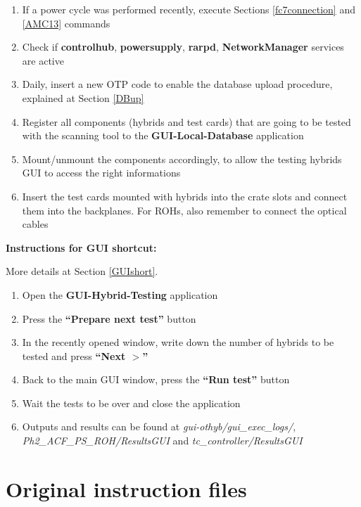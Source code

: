 \documentclass[10pt,a4paper]{article}
\begin{document}
\begin{enumerate}
    \item If a power cycle was performed recently, execute Sections \ref{fc7connection} and \ref{AMC13} commands
    \item Check if \textbf{controlhub}, \textbf{powersupply}, \textbf{rarpd}, \textbf{NetworkManager} services are active 
    \item Daily, insert a new OTP code to enable the database upload procedure, explained at Section \ref{DBup}
    \item Register all components (hybrids and test cards) that are going to be tested with the scanning tool to the \textbf{GUI-Local-Database} application 
    \item Mount/unmount the components accordingly, to allow the testing hybrids GUI to access the right informations
    \item Insert the test cards mounted with hybrids into the crate slots and connect them into the backplanes. For ROHs, also remember to connect the optical cables
\end{enumerate}

\vspace{1cm}

{\Large{\textbf{Instructions for GUI shortcut:}}}
\newline

More details at Section \ref{GUIshort}.

\begin{enumerate}
    \item Open the \textbf{GUI-Hybrid-Testing} application
    \item Press the \textbf{``Prepare next test''} button
    \item In the recently opened window, write down the number of hybrids to be tested and press \textbf{``Next $>$''}
    \item Back to the main GUI window, press the \textbf{``Run test''} button 
    \item Wait the tests to be over and close the application
    \item Outputs and results can be found at \textit{gui-othyb/gui\_exec\_logs/}, \newline \textit{Ph2\_ACF\_PS\_ROH/ResultsGUI} and \textit{tc\_controller/ResultsGUI}
    
\end{enumerate}

\newpage

\section{Original instruction files}


\end{document}
